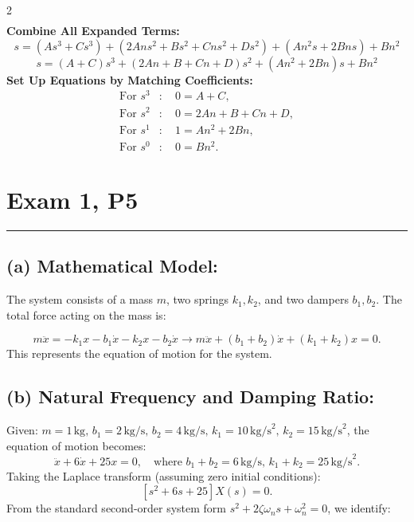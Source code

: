 \documentclass[letterpaper,10pt]{article}
\let\oldsection\section
\renewcommand{\section}[1]{%
\vspace{-1em}
  \oldsection{#1}%
  \par\vspace{-2em}%
  \noindent\rule{0.5\textwidth}{0.5pt}%
  \vspace{0em}%
}
\begin{document}
\begin{multicols}{2}
\begin{align*}
\end{align*}
\newline
\textbf{Combine All Expanded Terms:}
\begin{equation*}
s = (A s^3 + C s^3) + (2A n s^2 + B s^2 + C n s^2 + D s^2) + (A n^2 s + 2B n s) + B n^2
\end{equation*}
\begin{equation*}
s = (A + C) s^3 + (2A n + B + C n + D) s^2 + (A n^2 + 2B n) s + B n^2
\end{equation*}
\newline
\textbf{Set Up Equations by Matching Coefficients:}
\begin{align*}
\text{For } s^3 &: \quad 0 = A + C, \\
\text{For } s^2 &: \quad 0 = 2A n + B + C n + D, \\
\text{For } s^1 &: \quad 1 = A n^2 + 2B n, \\
\text{For } s^0 &: \quad 0 = B n^2.
\end{align*}

\section{Exam 1, P5}
\subsection*{(a) Mathematical Model:}
The system consists of a mass \(m\), two springs \(k_1, k_2\), and two dampers \(b_1, b_2\). The total force acting on the mass is:

\[
m\ddot{x} = -k_1x - b_1\dot{x} - k_2x - b_2\dot{x} \xrightarrow{} m\ddot{x} + (b_1 + b_2)\dot{x} + (k_1 + k_2)x = 0.
\]
This represents the equation of motion for the system.

\subsection*{(b) Natural Frequency and Damping Ratio:}

Given: \(m = 1 \, \text{kg}, \, b_1 = 2 \, \text{kg/s}, \, b_2 = 4 \, \text{kg/s}, \, k_1 = 10 \, \text{kg/s}^2, \, k_2 = 15 \, \text{kg/s}^2\),
\newline 
the equation of motion becomes:
\[
\ddot{x} + 6\dot{x} + 25x = 0, \quad \text{where } b_1 + b_2 = 6 \, \text{kg/s}, \, k_1 + k_2 = 25 \, \text{kg/s}^2.
\]
\newline
Taking the Laplace transform (assuming zero initial conditions):
\[
[s^2 + 6s + 25]X(s) = 0.
\]
\newline
From the standard second-order system form \(s^2 + 2\zeta \omega_n s + \omega_n^2 = 0\), we identify:


\end{multicols}
\end{document}

